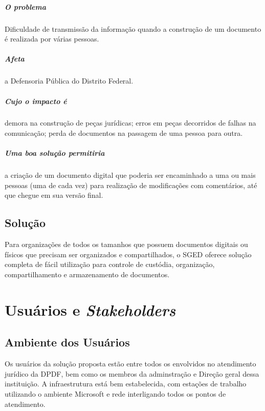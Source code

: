 \documentclass[12pt,a4paper]{report}
\begin{document}
\paragraph{O problema} Dificuldade de transmissão da informação quando a construção de um documento é realizada por várias pessoas.
\paragraph{Afeta} a Defensoria Pública do Distrito Federal.
\paragraph{Cujo o impacto é} demora na construção de peças jurídicas; erros em peças decorridos de falhas na comunicação; perda de documentos na passagem de uma pessoa para outra.
\paragraph{Uma boa solução permitiria} a criação de um documento digital que poderia ser encaminhado a uma ou mais pessoas (uma de cada vez) para realização de modificações com comentários, até que chegue em sua versão final.

\section{Solução}

Para organizações de todos os tamanhos que possuem documentos digitais ou físicos que precisam ser organizados e compartilhados, o SGED oferece solução completa de fácil utilização para controle de custódia, organização, compartilhamento e armazenamento de documentos.

\chapter{Usuários e \textit{Stakeholders}}

\section{Ambiente dos Usuários}

Os usuários da solução proposta estão entre todos os envolvidos no atendimento jurídico da DPDF, bem como os membros da adminstração e Direção geral dessa instituição. A infraestrutura está bem estabelecida, com estações de trabalho utilizando o ambiente Microsoft e rede interligando todos os pontos de atendimento.
\end{document}
